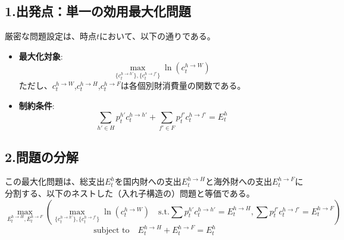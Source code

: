 \subsection*{1.出発点：単一の効用最大化問題}
\label{sec:appendix_equivalence_sub1}
厳密な問題設定は、時点\(t\)において、以下の通りである。
\begin{itemize}
    \item\label{itm:appendix_equivalence_sub1_objective}\textbf{最大化対象}:
    \begin{equation}
    \max_{\{c_t^{h\to h'}\},\{c_t^{h\to f'}\}}\ln(c_t^{h\to W})
    \label{eq:appendix_equivalence_sub1_single_max_objective}
    \end{equation}
    ただし、\(c_t^{h\to W}\),\(c_t^{h\to H}\),\(c_t^{h\to F}\)は各個別財消費量の関数である。

    \item\label{itm:appendix_equivalence_sub1_constraint}\textbf{制約条件}:
    \begin{equation}
    \sum_{h'\in H}p_t^{h'}c_t^{h\to h'}+\sum_{f'\in F}p_t^{f'}c_t^{h\to f'}=E_t^h
    \label{eq:appendix_equivalence_sub1_single_max_constraint}
    \end{equation}
\end{itemize}

\subsection*{2.問題の分解}
\label{sec:appendix_equivalence_sub2}
この最大化問題は、総支出\(E_t^h\)を国内財への支出\(E_t^{h\to H}\)と海外財への支出\(E_t^{h\to F}\)に分割する、以下のネストした（入れ子構造の）問題と等価である。
\begin{equation}
\max_{E_t^{h\to H},E_t^{h\to F}}\left(\max_{\{c_t^{h\to h'}\},\{c_t^{h\to f'}\}}\ln(c_t^{h\to W})\quad\text{s.t.}\sum p_t^{h'}c_t^{h\to h'}=E_t^{h\to H},\sum p_t^{f'}c_t^{h\to f'}=E_t^{h\to F}\right)
\label{eq:appendix_equivalence_sub2_nested_problem}
\end{equation}
\begin{equation}
\text{subject to}\quad E_t^{h\to H}+E_t^{h\to F}=E_t^h
\label{eq:appendix_equivalence_sub2_nested_constraint}
\end{equation}

